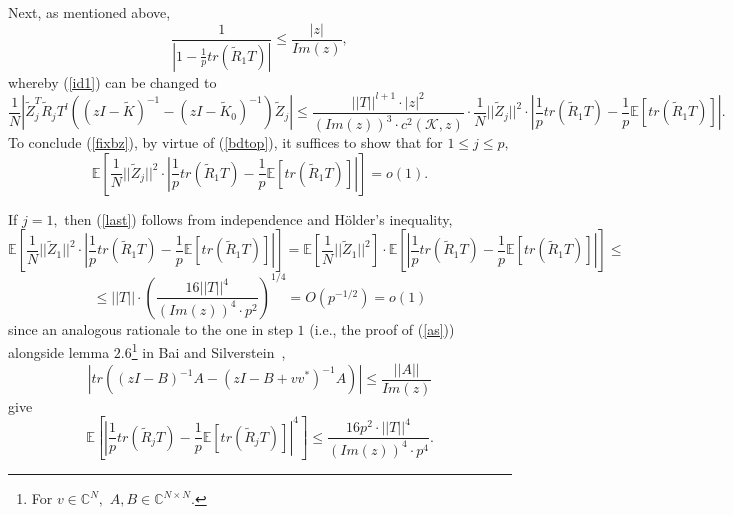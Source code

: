\documentclass{article}
\numberwithin{equation}{section}
\begin{document}
\par
Next, as mentioned above, 
\begin{equation}\label{anorm}
    \frac{1}{|1-\frac{1}{p}tr(\tilde{R}_1T)|} \leq \frac{|z|}{Im(z)},
\end{equation}
whereby (\ref{id1}) can be changed to
\[\frac{1}{N}|\tilde{Z}_j^T\tilde{R}_jT^l((zI-\tilde{K})^{-1}-(zI-\tilde{K}_0)^{-1})\tilde{Z}_j| \leq \frac{||T||^{l+1} \cdot |z|^2}{(Im(z))^3 \cdot c^2(\mathcal{K},z)} \cdot \frac{1}{N}||\tilde{Z}_j||^2 \cdot |\frac{1}{p}tr(\tilde{R}_1T)-\frac{1}{p}\mathbb{E}[tr(\tilde{R}_1T)]|.\]
To conclude (\ref{fixbz}), by virtue of (\ref{bdtop}), it suffices to show that for \(1 \leq j \leq p,\)
\begin{equation}\label{last}
    \mathbb{E}[\frac{1}{N}||\tilde{Z}_j||^2 \cdot |\frac{1}{p}tr(\tilde{R}_1T)-\frac{1}{p}\mathbb{E}[tr(\tilde{R}_1T)]|]=o(1).
\end{equation}
\par
If \(j=1,\) then (\ref{last}) follows from independence and Hölder's inequality,
\[\mathbb{E}[\frac{1}{N}||\tilde{Z}_1||^2 \cdot |\frac{1}{p}tr(\tilde{R}_1T)-\frac{1}{p}\mathbb{E}[tr(\tilde{R}_1T)]|]=\mathbb{E}[\frac{1}{N}||\tilde{Z}_1||^2] \cdot \mathbb{E}[|\frac{1}{p}tr(\tilde{R}_1T)-\frac{1}{p}\mathbb{E}[tr(\tilde{R}_1T)]|] \leq\]
\[\leq ||T|| \cdot (\frac{16||T||^{4}}{(Im(z))^4 \cdot p^{2}})^{1/4}=O(p^{-1/2})=o(1)\]
since an analogous rationale to the one in step \(1\) (i.e., the proof of (\ref{as})) 
alongside lemma \(2.6\)\footnote{For \(v \in \mathbb{C}^N,\) \(A,B \in \mathbb{C}^{N \times N}.\)} in Bai and Silverstein~\cite{silv2},
\begin{equation}\label{2.6}
    |tr((zI-B)^{-1}A-(zI-B+vv^*)^{-1}A)| \leq \frac{||A||}{Im(z)}
\end{equation}
give
\[\mathbb{E}[|\frac{1}{p}tr(\tilde{R}_jT)-\frac{1}{p}\mathbb{E}[tr(\tilde{R}_jT)]|^{4}] \leq \frac{16p^2 \cdot ||T||^{4}}{(Im(z))^4 \cdot p^{4}}.\]
\end{document}
